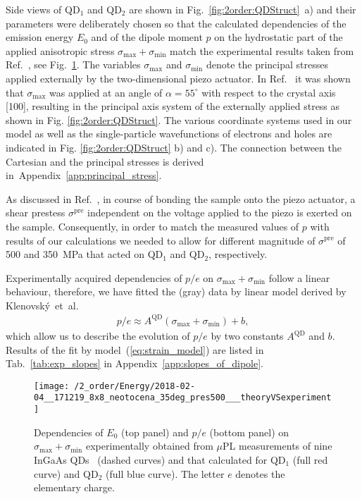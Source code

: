 Side views of QD$_1$ and QD$_2$ are shown in Fig.~\ref{fig:2order:QDStruct}~a) and their parameters were deliberately chosen so that the calculated dependencies of the emission energy $E_0$ and of the dipole moment $p$ on the hydrostatic part of the applied anisotropic stress $\sigma_{\mathrm{max}}+\sigma_{\mathrm{min}}$ match the experimental results taken from Ref.~\cite{Aberl:17}, see Fig.~\ref{fig:TheorVsExp}. The variables $\sigma_{\mathrm{max}}$ and $\sigma_{\mathrm{min}}$ denote the principal stresses~\cite{Trotta:15} applied externally by the two-dimensional piezo actuator. In  Ref.~\citep{Aberl:17} it was shown that $\sigma_{\mathrm{max}}$ was applied at an angle of $\alpha=55^{\circ}$ with respect to the crystal axis [100], resulting in the principal axis system of the externally applied stress as shown in Fig. \ref{fig:2order:QDStruct}. The various coordinate systems used in our model as well as the single-particle wavefunctions of electrons and holes are indicated in Fig. \ref{fig:2order:QDStruct} b) and c). The connection between the Cartesian and the principal stresses is derived in~Appendix~\ref{app:principal_stress}.

As discussed in Ref.~\cite{Aberl:17}, in course of bonding the sample onto the piezo actuator, a shear prestess $\sigma^\text{pre}$ independent on the voltage applied to the piezo is exerted on the sample. Consequently, in order to match the measured values of $p$ with results of our calculations we needed to allow for different magnitude of $\sigma^\text{pre}$ of 500 and 350~MPa that acted on QD$_1$ and QD$_2$, respectively.

Experimentally acquired dependencies of $p/e$ on $\sigma_{\mathrm{max}}+\sigma_{\mathrm{min}}$ follow a linear behaviour, therefore, we have fitted the (gray) data by linear model derived by Klenovský~et~al.~\cite{Klenovsky_2018_InGaAs_straintuned}
%
\begin{eqnarray}
p/e\approx A^{\mathrm{QD}}\left(\sigma_\mathrm{max}+\sigma_\mathrm{min}\right)+b, \label{eq:strain_model}
\end{eqnarray}
%
which allow us to describe the evolution of $p/e$ by two constants $A^{\mathrm{QD}}$ and $b$. Results of the fit by model~(\ref{eq:strain_model}) are listed in Tab.~\ref{tab:exp_slopes} in Appendix~\ref{app:slopes_of_dipole}.

%


\begin{figure}[!ht]
	\centering
	\renewcommand{\tabcolsep}{2pt}
	\texttt{[image: /2\_order/Energy/2018-02-04\_\_171219\_8x8\_neotocena\_35deg\_pres500\_\_\_theoryVSexperiment]} 
	\caption{
		Dependencies of $E_0$ (top panel) and $p/e$ (bottom panel) on $\sigma_{\mathrm{max}}+\sigma_{\mathrm{min}}$ experimentally obtained from $\mu$PL measurements of nine InGaAs QDs~\cite{Aberl:17} (dashed curves) and that calculated for QD$_1$ (full red curve) and QD$_2$ (full blue curve). The letter $e$ denotes the elementary charge.}
	\label{fig:TheorVsExp}
\end{figure}

